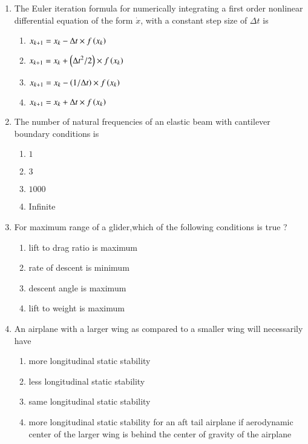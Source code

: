 \documentclass[journal]{IEEEtran}
\begin{document}
\begin{enumerate}
    \item The Euler iteration formula for numerically integrating a first order nonlinear differential equation of the form $\dot{x}$, with a constant step size of $\Delta t$ is 
    \begin{enumerate}
    \item $x_{k+1} = x_{k} - \Delta t \times f\left(x_{k}\right)$ 
    \item $x_{k+1} = x_{k} + \left({\Delta t}^2/2\right) \times f\left(x_{k}\right)$ 
    \item $x_{k+1} = x_{k} - \left(1/{\Delta t}\right) \times f\left(x_{k}\right)$ 
    \item $x_{k+1} = x_{k} + \Delta t \times f\left(x_{k}\right)$ \\
    \end{enumerate}

    \item The number of natural frequencies of an elastic beam with cantilever boundary conditions is 
    \begin{enumerate}
        \item $1$
        \item $3$
        \item $1000$
        \item Infinite\\
    \end{enumerate}

    \item For maximum range of a glider,which of the following conditions is true ?
    \begin{enumerate}
        \item lift to drag ratio is maximum
        \item rate of descent is minimum
        \item descent angle is maximum
        \item lift to weight is maximum \\
    \end{enumerate}

    \item An airplane with a larger wing as compared to a smaller wing will necessarily have 
    \begin{enumerate}
        \item more longitudinal static stability
        \item less longitudinal static stability
        \item same longitudinal static stability
        \item more longitudinal static stability for an aft tail airplane if aerodynamic center of the larger wing is behind the center of gravity of the airplane \\
    \end{enumerate}


\end{enumerate}
\end{document}
